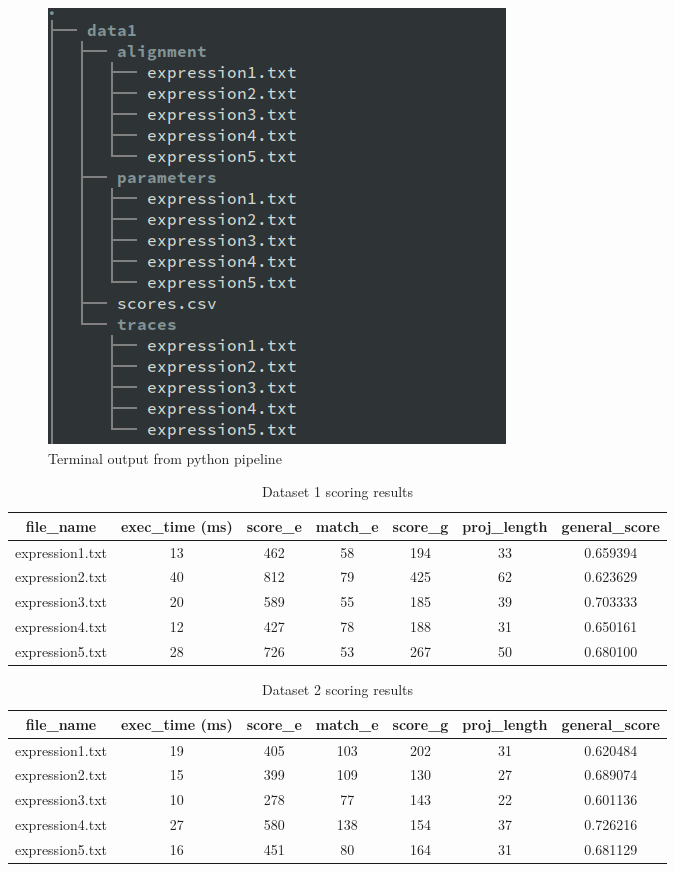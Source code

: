 \documentclass[12pt,a4paper]{article}
\begin{document}
\begin{figure}[H]
	\centering
	\includegraphics[width=0.45\linewidth]{img/terminal_tree.png}
	\caption{Terminal output from python pipeline}
	\label{fig:tree}
\end{figure}

\pagebreak

\begin{table}[H]
	\begin{center}
		\caption{Dataset 1 scoring results}
		\begin{tabular}{|c|c|c|c|c|c|c|}
			\hline
			\textbf{file\_name} & \textbf{exec\_time} (ms) & \textbf{score\_e} & \textbf{match\_e} & \textbf{score\_g} & \textbf{proj\_length} & \textbf{general\_score} \\
			\hline\hline
			expression1.txt & 13 & 462 & 58 & 194 & 33 & 0.659394 \\
			\hline
			expression2.txt & 40 & 812 & 79 & 425 & 62 & 0.623629 \\
			\hline
			expression3.txt & 20 & 589 & 55 & 185 & 39 & 0.703333 \\
			\hline
			expression4.txt & 12 & 427 & 78 & 188 & 31 & 0.650161 \\
			\hline
			expression5.txt & 28 & 726 & 53 & 267 & 50 & 0.680100 \\
			\hline
		\end{tabular}
	\end{center}
\end{table}

\begin{table}[H]
	\begin{center}
		\caption{Dataset 2 scoring results}
		\begin{tabular}{|c|c|c|c|c|c|c|}
			\hline
			\textbf{file\_name} & \textbf{exec\_time} (ms) & \textbf{score\_e} & \textbf{match\_e} & \textbf{score\_g} & \textbf{proj\_length} & \textbf{general\_score} \\
			\hline\hline
			expression1.txt & 19 & 405 & 103 & 202 & 31 & 0.620484 \\
			\hline
			expression2.txt & 15 & 399 & 109 & 130 & 27 & 0.689074 \\
			\hline
			expression3.txt & 10 & 278 & 77  & 143 & 22 & 0.601136 \\
			\hline
			expression4.txt & 27 & 580 & 138 & 154 & 37 & 0.726216 \\
			\hline
			expression5.txt & 16 & 451 & 80  & 164 & 31 & 0.681129 \\
			\hline
		\end{tabular}
	\end{center}
\end{table}
\end{document}
